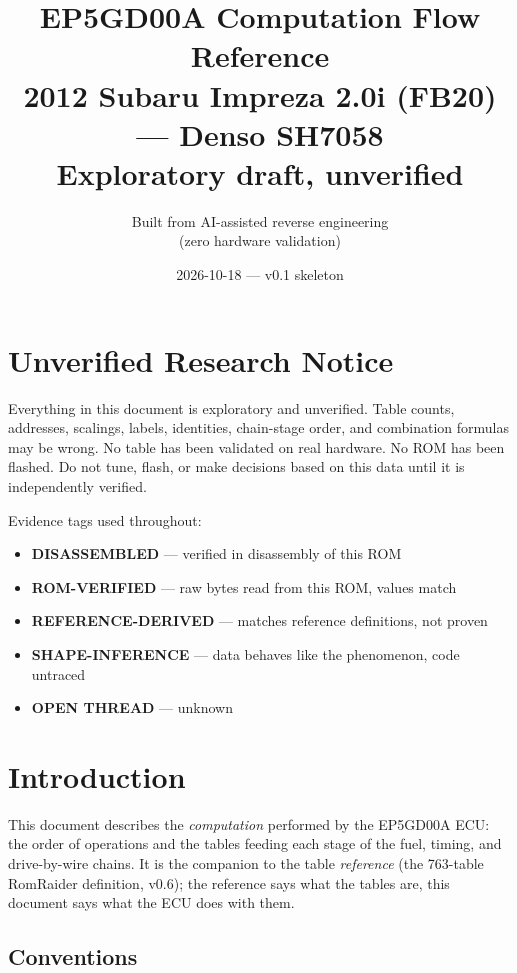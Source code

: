 \documentclass[11pt,a4paper]{book}
\title{EP5GD00A Computation Flow Reference\\
\large 2012 Subaru Impreza 2.0i (FB20) --- Denso SH7058\\
\large Exploratory draft, unverified}
\author{Built from AI-assisted reverse engineering\\(zero hardware validation)}
\date{2026-10-18 --- v0.1 skeleton}
\begin{document}
\maketitle

\chapter*{Unverified Research Notice}

Everything in this document is exploratory and unverified. Table counts,
addresses, scalings, labels, identities, chain-stage order, and combination
formulas may be wrong. No table has been validated on real hardware. No ROM
has been flashed. Do not tune, flash, or make decisions based on this data
until it is independently verified.

Evidence tags used throughout:
\begin{itemize}
  \item \textbf{DISASSEMBLED} --- verified in disassembly of this ROM
  \item \textbf{ROM-VERIFIED} --- raw bytes read from this ROM, values match
  \item \textbf{REFERENCE-DERIVED} --- matches reference definitions, not proven
  \item \textbf{SHAPE-INFERENCE} --- data behaves like the phenomenon, code untraced
  \item \textbf{OPEN THREAD} --- unknown
\end{itemize}

\chapter{Introduction}

This document describes the \emph{computation} performed by the EP5GD00A ECU:
the order of operations and the tables feeding each stage of the fuel,
timing, and drive-by-wire chains. It is the companion to the table
\emph{reference} (the 763-table RomRaider definition, v0.6); the reference
says what the tables are, this document says what the ECU does with them.

\section{Conventions}
\end{document}
